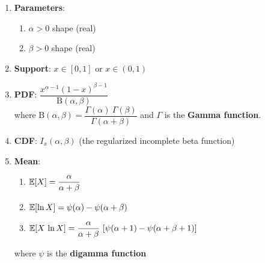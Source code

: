 \begin{enumerate}
    \item \textbf{Parameters}: 
    \begin{enumerate}
        \item $\alpha > 0$ shape (real)
        \hfill \cite{wiki/Beta_distribution}
        
        \item $\beta > 0$ shape (real)
        \hfill \cite{wiki/Beta_distribution}
    \end{enumerate}

    \item \textbf{Support}:  ${\displaystyle x\in [0,1]\!}$ or ${\displaystyle x\in (0,1)\!}$
    \hfill \cite{wiki/Beta_distribution}

    \item \textbf{PDF}:  ${\displaystyle {\dfrac {x^{\alpha -1}(1-x)^{\beta -1}}{\mathrm {B} (\alpha ,\beta )}}\!}$ 
    \hfill \cite{wiki/Beta_distribution}
    \\
    where ${\displaystyle \mathrm {B} (\alpha ,\beta )={\dfrac {\Gamma (\alpha )\ \Gamma (\beta )}{\Gamma (\alpha +\beta )}}}$ and ${\displaystyle \Gamma }$ is the \textbf{Gamma function}.
    \hfill \cite{wiki/Beta_distribution}

    \item \textbf{CDF}:  ${\displaystyle I_{x}(\alpha ,\beta )\!}$ (the regularized incomplete beta function)
    \hfill \cite{wiki/Beta_distribution}


    \item \textbf{Mean}:
    \begin{enumerate}
        \item ${\displaystyle \mathbb{E} [X]={\dfrac {\alpha }{\alpha +\beta }}\!}$
        \hfill \cite{wiki/Beta_distribution}

        \item ${\displaystyle \mathbb{E}[\ln X]=\psi (\alpha )-\psi (\alpha +\beta )\!}$
        \hfill \cite{wiki/Beta_distribution}

        \item ${\displaystyle \mathbb{E} [X\,\ln X]={\dfrac {\alpha }{\alpha +\beta }}\,\left[\psi (\alpha +1)-\psi (\alpha +\beta +1)\right]\!}$
        \hfill \cite{wiki/Beta_distribution}
    \end{enumerate}
    where ${\displaystyle \psi }$ is the \textbf{digamma function}
    \hfill \cite{wiki/Beta_distribution}


\end{enumerate}
